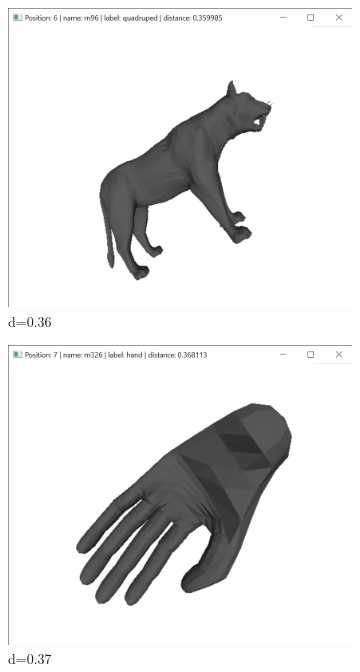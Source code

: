 \documentclass{bigdata}
\begin{document}
\begin{figure}[h!]
\begin{subfigure}[b]{0.09\linewidth}
    \includegraphics[width=\linewidth]{Pictures/Evaluation/m92/pos6.png}
    \caption*{d=0.36}
  \end{subfigure}
  \begin{subfigure}[b]{0.09\linewidth}
    \includegraphics[width=\linewidth]{Pictures/Evaluation/m92/pos7.png}
    \caption*{d=0.37}
  \end{subfigure}
  \begin{subfigure}[b]{0.09\linewidth}

\end{subfigure}
\end{figure}
\end{document}
